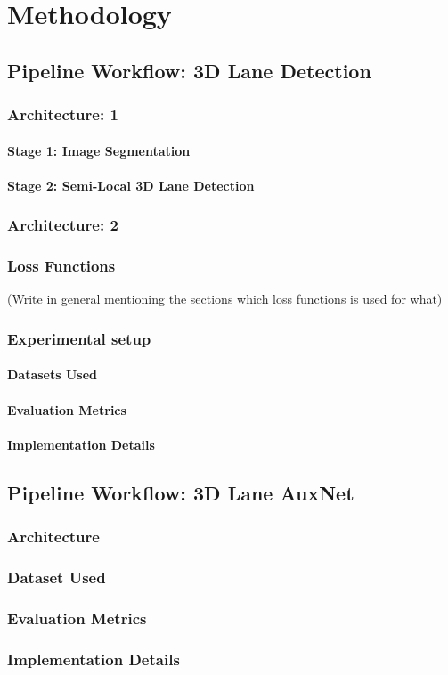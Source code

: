 

    \chapter{Methodology}

    \section{Pipeline Workflow: 3D Lane Detection }
    
    \subsection{Architecture: 1}
        \subsubsection{Stage 1: Image Segmentation}
        \subsubsection{Stage 2: Semi-Local 3D Lane Detection}
    
        \subsection{Architecture: 2}
    
    \subsection{Loss Functions}
        (Write in general mentioning the sections which loss functions is used for what)
        
    \subsection{Experimental setup}
        \subsubsection{Datasets Used}
        \subsubsection{Evaluation Metrics}
        \subsubsection{Implementation Details}
    
    \section{Pipeline Workflow: 3D Lane AuxNet}
        \subsection{Architecture}
        \subsection{Dataset Used}
        \subsection{Evaluation Metrics}
        \subsection{Implementation Details}
        

